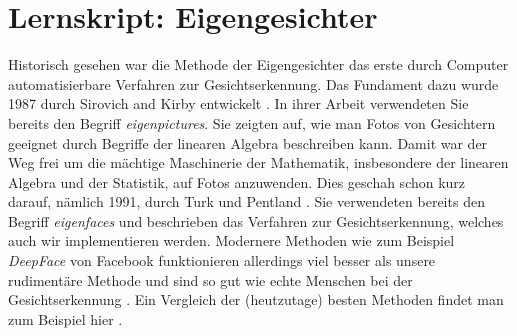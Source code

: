 \section*{Lernskript: Eigengesichter}
Historisch gesehen war die Methode der Eigengesichter das erste durch Computer automatisierbare Verfahren zur Gesichtserkennung.
Das Fundament dazu wurde 1987 durch Sirovich and Kirby entwickelt \cite{SirovichKirby1987}.
In ihrer Arbeit verwendeten Sie bereits den Begriff \textit{eigenpictures}.
Sie zeigten auf, wie man Fotos von Gesichtern geeignet durch Begriffe der linearen Algebra beschreiben kann.
Damit war der Weg frei um die mächtige Maschinerie der Mathematik, insbesondere der linearen Algebra und der Statistik, auf Fotos anzuwenden.
Dies geschah schon kurz darauf, nämlich 1991, durch Turk und Pentland \cite{Turk1991}.
Sie verwendeten bereits den Begriff \textit{eigenfaces} und beschrieben das Verfahren zur Gesichtserkennung, welches auch wir implementieren werden.
Modernere Methoden wie zum Beispiel \textit{DeepFace} von Facebook funktionieren allerdings viel besser als unsere rudimentäre Methode und sind so gut wie echte Menschen bei der Gesichtserkennung \cite{Taigman2014}.
Ein Vergleich der (heutzutage) besten Methoden findet man zum Beispiel hier \cite{Taskiran2020}.

